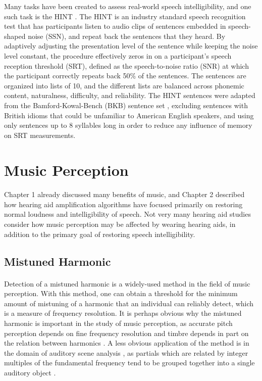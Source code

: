 Many tasks have been created to assess real-world speech intelligibility, and one such task is the HINT \cite{Nilsson1994}.  The HINT is an industry standard speech recognition test that has participants listen to audio clips of sentences embedded in speech-shaped noise (SSN), and repeat back the sentences that they heard.  By adaptively adjusting the presentation level of the sentence while keeping the noise level constant, the procedure effectively zeros in on a participant's speech reception threshold (SRT), defined as the speech-to-noise ratio (SNR) at which the participant correctly repeats back 50\% of the sentences.  The sentences are organized into lists of 10, and the different lists are balanced across phonemic content, naturalness, difficulty, and reliability.  The HINT sentences were adapted from the Bamford-Kowal-Bench (BKB) sentence set \cite{Bench1979}, excluding sentences with British idioms that could be unfamiliar to American English speakers, and using only sentences up to 8 syllables long in order to reduce any influence of memory on SRT measurements.

\section{Music Perception}
\paragraph{}Chapter 1 already discussed many benefits of music, and Chapter 2 described how hearing aid amplification algorithms have focused primarily on restoring normal loudness and intelligibility of speech.  Not very many hearing aid studies consider how music perception may be affected by wearing hearing aids, in addition to the primary goal of restoring speech intelligibility.

\subsection{Mistuned Harmonic}
\paragraph{}Detection of a mistuned harmonic is a widely-used method in the field of music perception.  With this method, one can obtain a threshold for the minimum amount of mistuning of a harmonic that an individual can reliably detect, which is a measure of frequency resolution.  It is perhaps obvious why the mistuned harmonic is important in the study of music perception, as accurate pitch perception depends on fine frequency resolution and timbre depends in part on the relation between harmonics \cite{Grey1977}.  A less obvious application of the method is in the domain of auditory scene analysis \cite{Bregman1994}, as partials which are related by integer multiples of the fundamental frequency tend to be grouped together into a single auditory object \cite{Hartmann1996}.

